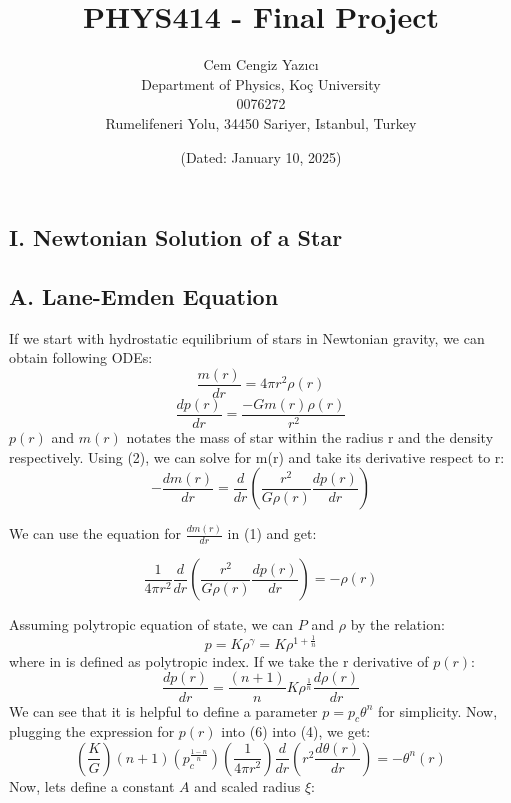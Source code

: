 \documentclass{article}
\title{PHYS414 - Final Project}
\author{
    Cem Cengiz Yazıcı \\
    Department of Physics, Koç University \\
    0076272 \\
    Rumelifeneri Yolu, 34450 Sariyer, Istanbul, Turkey
}
\date{(Dated: January 10, 2025)}
\begin{document}
\maketitle

\begin{center}
    \section*{I. Newtonian Solution of a Star}
\end{center}

\subsection*{A. Lane-Emden Equation}
If we start with hydrostatic equilibrium of stars in Newtonian gravity, we can obtain following ODEs:
\begin{equation}
    \frac{m(r)}{dr} = 4\pi r^2\rho(r) 
\end{equation}
\begin{equation}
    \frac{dp(r)}{dr} = \frac{-Gm(r)\rho (r)}{r^2}
\end{equation}
$p(r)$ and $m(r)$ notates the mass of star within the radius r and the density respectively. Using (2), we can solve for m(r) and take its derivative respect to r:
\begin{equation}
    -\frac{dm(r)}{dr} = \frac{d}{dr}(\frac{r^2}{G\rho(r)}\frac{dp(r)}{dr}) 
\end{equation}

We can use the equation for $\displaystyle\frac{dm(r)}{dr}$ in (1) and get:

\begin{equation}
    \frac{1}{4\pi r^2}\frac{d}{dr}(\frac{r^2}{G\rho(r)}\frac{dp(r)}{dr}) = -\rho(r)
\end{equation}

Assuming polytropic equation of state, we can $P$ and $\rho$ by the relation:
\begin{equation}
    p = K\rho ^\gamma = K\rho ^{1+\frac{1}{n}}
\end{equation}
where in is defined as polytropic index. If we take the r derivative of $p(r)$:
\begin{equation}
    \frac{dp(r)}{dr} = \frac{(n+1)}{n}K\rho^{\frac{1}{n}}\frac{d\rho(r)}{dr}
\end{equation}
We can see that it is helpful to define a parameter $p = p_c\theta^n$ for simplicity. Now, plugging the expression for $p(r)$ into (6) into (4), we get:
\begin{equation}
    (\frac{K}{G})(n+1)(p_c^{\frac{1-n}{n}})(\frac{1}{4\pi r^2})\frac{d}{dr}(r^2\frac{d\theta(r)}{dr}) = -\theta^n(r)
\end{equation}
Now, lets define a constant $A$ and scaled radius $\xi$:
\end{document}
